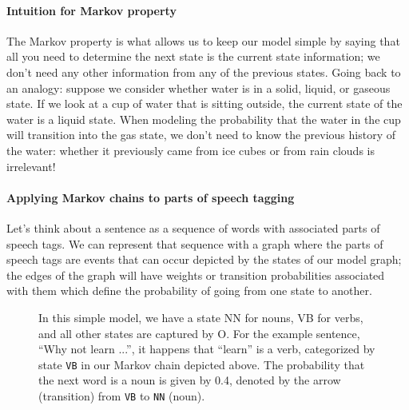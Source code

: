 \documentclass[12pt]{article}
\begin{document}
\paragraph{Intuition for Markov property}
The Markov property is what allows us to keep our model simple by saying that all you need to determine the next state is the current state information; we don't need any other information from any of the previous states. Going back to an analogy: suppose we consider whether water is in a solid, liquid, or gaseous state. If we look at a cup of water that is sitting outside, the current state of the water is a liquid state. When modeling the probability that the water in the cup will transition into the gas state, we don't need to know the previous history of the water: whether it previously came from ice cubes or from rain clouds is irrelevant!

\paragraph{Applying Markov chains to parts of speech tagging} Let's think about a sentence as a sequence of words with associated parts of speech tags. We can represent that sequence with a graph where the parts of speech tags are events that can occur depicted by the states of our model graph; the edges of the graph will have weights or transition probabilities associated with them which define the probability of going from one state to another.

\begin{figure}[h]
  \begin{center}
    \caption{In this simple model, we have a state NN for nouns, VB for verbs, and all other states are captured by O. For the example sentence, ``Why not learn ...'', it happens that ``learn'' is a verb, categorized by state \texttt{VB} in our Markov chain depicted above. The probability that the next word is a noun is given by 0.4, denoted by the arrow (transition) from \texttt{VB} to \texttt{NN} (noun).}
  \end{center}
\end{figure}
\end{document}
